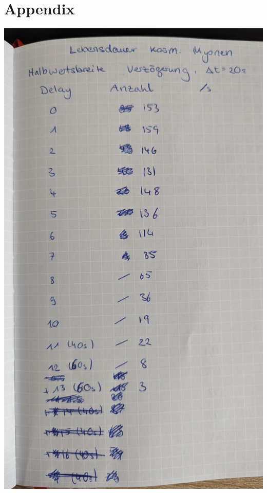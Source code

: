 \chapter*{Appendix}
\label{cha:Messdaten}

\centering
\includegraphics[height = \textheight]{pics/muon_data_1.jpg}
\newpage
